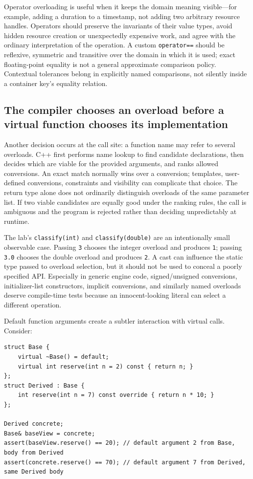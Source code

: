 Operator overloading is useful when it keeps the domain meaning visible---for example, adding a duration to a timestamp, not adding two arbitrary resource handles. Operators should preserve the invariants of their value types, avoid hidden resource creation or unexpectedly expensive work, and agree with the ordinary interpretation of the operation. A custom \texttt{operator==} should be reflexive, symmetric and transitive over the domain in which it is used; exact floating-point equality is not a general approximate comparison policy. Contextual tolerances belong in explicitly named comparisons, not silently inside a container key's equality relation.

\subsection{The compiler chooses an overload before a virtual function chooses its implementation}\label{05-engine-i-ch004-the-compiler-chooses-an-overload-before-a-virtual-function-chooses-its-implementation}

Another decision occurs at the call site: a function name may refer to several overloads. C++ first performs name lookup to find candidate declarations, then decides which are viable for the provided arguments, and ranks allowed conversions. An exact match normally wins over a conversion; templates, user-defined conversions, constraints and visibility can complicate that choice. The return type alone does not ordinarily distinguish overloads of the same parameter list. If two viable candidates are equally good under the ranking rules, the call is ambiguous and the program is rejected rather than deciding unpredictably at runtime.

The lab's \texttt{classify(int)} and \texttt{classify(double)} are an intentionally small observable case. Passing \texttt{3} chooses the integer overload and produces \texttt{1}; passing \texttt{3.0} chooses the double overload and produces \texttt{2}. A cast can influence the static type passed to overload selection, but it should not be used to conceal a poorly specified API. Especially in generic engine code, signed/unsigned conversions, initializer-list constructors, implicit conversions, and similarly named overloads deserve compile-time tests because an innocent-looking literal can select a different operation.

Default function arguments create a subtler interaction with virtual calls. Consider:

\begin{verbatim}
struct Base {
    virtual ~Base() = default;
    virtual int reserve(int n = 2) const { return n; }
};
struct Derived : Base {
    int reserve(int n = 7) const override { return n * 10; }
};

Derived concrete;
Base& baseView = concrete;
assert(baseView.reserve() == 20); // default argument 2 from Base, body from Derived
assert(concrete.reserve() == 70); // default argument 7 from Derived, same Derived body
\end{verbatim}

